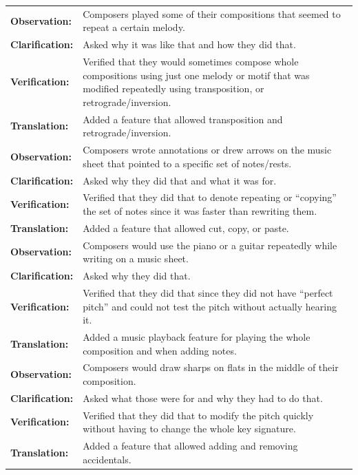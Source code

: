 \begin{longtable}{|p{2.5cm} p{12.5cm}|}
		  	\textbf{Observation:} 	& Composers played some of their compositions that seemed to repeat a certain melody. \\
		  	\textbf{Clarification:} 	& Asked why it was like that and how they did that. \\
		  	\textbf{Verification:} 	& Verified that they would sometimes compose whole compositions using just one melody or motif that was modified repeatedly using transposition, or retrograde/inversion. \\
		  	\textbf{Translation:} 	& Added a feature that allowed transposition and retrograde/inversion. \\
		  	\hline

		  	\textbf{Observation:} 	& Composers wrote annotations or drew arrows on the music sheet that pointed to a specific set of notes/rests. \\
		  	\textbf{Clarification:} 	& Asked why they did that and what it was for. \\
		  	\textbf{Verification:} 	& Verified that they did that to denote repeating or ``copying'' the set of notes since it was faster than rewriting them. \\
		  	\textbf{Translation:} 	& Added a feature that allowed cut, copy, or paste. \\
		  	\hline

		  	\textbf{Observation:} 	& Composers would use the piano or a guitar repeatedly while writing on a music sheet. \\
		  	\textbf{Clarification:} 	& Asked why they did that. \\
		  	\textbf{Verification:} 	& Verified that they did that since they did not have ``perfect pitch'' and could not test the pitch without actually hearing it. \\
		  	\textbf{Translation:} 	& Added a music playback feature for playing the whole composition and when adding notes.  \\
		  	\hline

		  	\textbf{Observation:} 	& Composers would draw sharps on flats in the middle of their composition. \\
		  	\textbf{Clarification:} 	& Asked what those were for and why they had to do that. \\
		  	\textbf{Verification:} 	& Verified that they did that to modify the pitch quickly without having to change the whole key signature. \\
		  	\textbf{Translation:} 	& Added a feature that allowed adding and removing accidentals.  \\
		  	\hline


\end{longtable}
